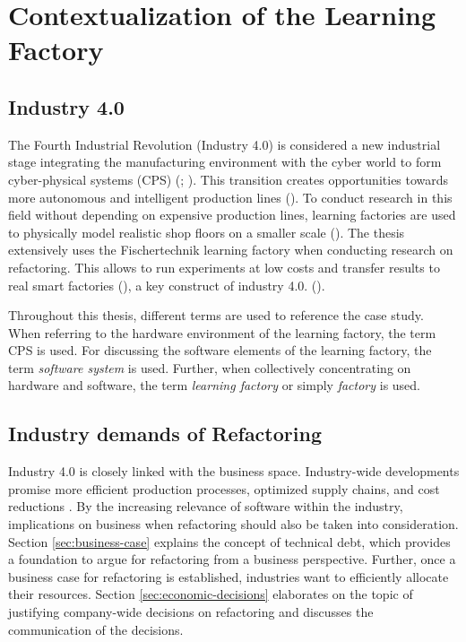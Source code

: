 \chapter{Contextualization of the Learning Factory}

\section{Industry 4.0}
The Fourth Industrial Revolution (Industry 4.0) is considered a new industrial stage integrating the manufacturing environment with the cyber world to form cyber-physical systems (CPS) (\cite{jazdi2014}; \cite{wang2015}). This transition creates opportunities towards more autonomous and intelligent production lines (\cite{malburg2020}). To conduct research in this field without depending on expensive production lines, learning factories are used to physically model realistic shop floors on a smaller scale (\cite{malburg2020}). The thesis extensively uses the Fischertechnik learning factory when conducting research on refactoring. This allows to run experiments at low costs and transfer results to real smart factories (\cite{malburg2020}), a key construct of industry 4.0. (\cite{osterrieder2020}). 

Throughout this thesis, different terms are used to reference the case study. When referring to the hardware environment of the learning factory, the term CPS is used. For discussing the software elements of the learning factory, the term \emph{software system} is used. Further, when collectively concentrating on hardware and software, the term \emph{learning factory} or simply \emph{factory} is used.

\section{Industry demands of Refactoring}
Industry 4.0 is closely linked with the business space. Industry-wide developments promise more efficient production processes, optimized supply chains, and cost reductions \cite{malburg2020}. By the increasing relevance of software within the industry, implications on business when refactoring should also be taken into consideration. Section \ref{sec:business-case} explains the concept of technical debt, which provides a foundation to argue for refactoring from a business perspective. Further, once a business case for refactoring is established, industries want to efficiently allocate their resources. Section \ref{sec:economic-decisions} elaborates on the topic of justifying company-wide decisions on refactoring and discusses the communication of the decisions.

